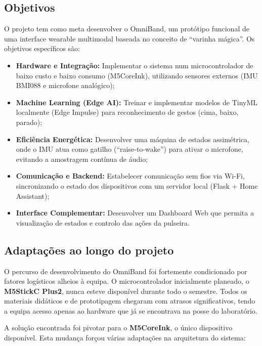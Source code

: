 \documentclass[11pt, a4paper]{article}
\begin{document}
\subsection{Objetivos}
O projeto tem como meta desenvolver o OmniBand, um protótipo funcional de uma interface wearable multimodal baseada no conceito de ``varinha mágica''. Os objetivos específicos são:
\begin{itemize}
    \item \textbf{Hardware e Integração:} Implementar o sistema num microcontrolador de baixo custo e baixo consumo (M5CoreInk), utilizando sensores externos (IMU BMI088 e microfone analógico);
    \item \textbf{Machine Learning (Edge AI):} Treinar e implementar modelos de TinyML localmente (Edge Impulse) para reconhecimento de gestos (cima, baixo, parado);
    \item \textbf{Eficiência Energética:} Desenvolver uma máquina de estados assimétrica, onde o IMU atua como gatilho (``raise-to-wake'') para ativar o microfone, evitando a amostragem contínua de áudio;
    \item \textbf{Comunicação e Backend:} Estabelecer comunicação sem fios via Wi-Fi, sincronizando o estado dos dispositivos com um servidor local (Flask + Home Assistant);
    \item \textbf{Interface Complementar:} Desenvolver um Dashboard Web que permita a visualização de estados e controlo das ações da pulseira.
\end{itemize}

\subsection{Adaptações ao longo do projeto}
O percurso de desenvolvimento do OmniBand foi fortemente condicionado por fatores logísticos alheios à equipa. O microcontrolador inicialmente planeado, o \textbf{M5StickC Plus2}, nunca esteve disponível durante todo o semestre. Todos os materiais didáticos e de prototipagem chegaram com atrasos significativos, tendo a equipa acesso apenas ao hardware que já se encontrava na posse do laboratório.

A solução encontrada foi pivotar para o \textbf{M5CoreInk}, o único dispositivo disponível. Esta mudança forçou várias adaptações na arquitetura do sistema:
\end{document}
